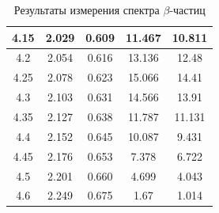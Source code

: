\documentclass[a4paper,12pt]{article} %
\begin{document}
\begin{table}[h]
\begin{tabular}{|c|c|c|c|c|}
        4.15 & 2.029 & 0.609 & 11.467 & 10.811 \\ \hline
        4.2 & 2.054 & 0.616 & 13.136 & 12.48 \\ \hline
        4.25 & 2.078 & 0.623 & 15.066 & 14.41 \\ \hline
        4.3 & 2.103 & 0.631 & 14.566 & 13.91 \\ \hline
        4.35 & 2.127 & 0.638 & 11.787 & 11.131 \\ \hline
        4.4 & 2.152 & 0.645 & 10.087 & 9.431 \\ \hline
        4.45 & 2.176 & 0.653 & 7.378 & 6.722 \\ \hline
        4.5 & 2.201 & 0.660 & 4.699 & 4.043 \\ \hline
        4.6 & 2.249 & 0.675 & 1.67 & 1.014 \\ \hline
    \end{tabular}
    \caption{Результаты измерения спектра $\beta$-частиц}
    \label{tab:graph_data}
\end{table}
\end{document}

